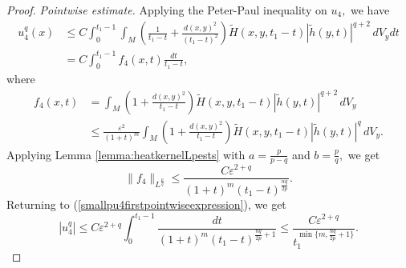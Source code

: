 \documentclass[12pt]{amsart}
\renewcommand{\1}{{\mathbf 1}}
\newcommand{\eps}{{\varepsilon}}
\theoremstyle{others}
\numberwithin{equation}{section}
\begin{document}
\begin{proof}
       \vspace{2mm}
       
      \emph{Pointwise estimate.} Applying the Peter-Paul inequality on $u_4,$ we have
       \begin{equation}\label{smallpu4firstpointwiseexpression}
       \begin{split}
           u^q_4(x) & \leq C \int_0^{t_1 - 1} \!\!\!\! \int_M \left( \frac{1}{t_1 - t} + \frac{d(x,y)^2  }{(t_1 - t)^{2} } \right) \tilde{H}(x,y,t_1 - t) |\tilde{h}(y,t)|^{q + 2}  \, dV_y dt \\
           & = C \int_0^{t_1 - 1} \!\!\!\! f_4(x,t) \frac{dt}{t_1 - t},
           \end{split}
       \end{equation}
       where
       \begin{equation*}
       \begin{split}
       f_4(x,t) & = \int_M \left( 1 + \frac{d(x,y)^2  }{t_1 - t } \right) \tilde{H}(x,y,t_1 - t) |\tilde{h}(y,t)|^{q + 2}  \, dV_y \\
           & \leq \frac{\eps^{2}}{(1 + t)^m} \int_M \left( 1 + \frac{d(x,y)^2 }{t_1 - t } \right) \tilde{H}(x,y,t_1 - t)  |\tilde{h}(y,t)|^q \, dV_y.
           \end{split}
           \end{equation*}
    Applying Lemma \ref{lemma:heatkernelLpests} with $a = \frac{p}{p - q}$ and $b = \frac{p}{q},$ we get
    \begin{equation*}
        \|f_4\|_{L^{\frac{p}{q}}} \leq \frac{C \eps^{2 + q}}{(1 + t)^m(t_1 - t)^{\frac{nq}{2p}} }.
        \end{equation*}
        Returning to (\ref{smallpu4firstpointwiseexpression}), we get
        \begin{equation}
            |u_4^q| \leq C \eps^{2 + q} \int_0^{t_1 - 1} \frac{dt}{(1 + t)^m (t_1 - t)^{\frac{nq}{2p} + 1} } \leq \frac{C \eps^{2 + q}}{t_1^{\min\{ m, \frac{nq}{2p} + 1 \} } }.
        \end{equation}
    

\end{proof}
\end{document}
